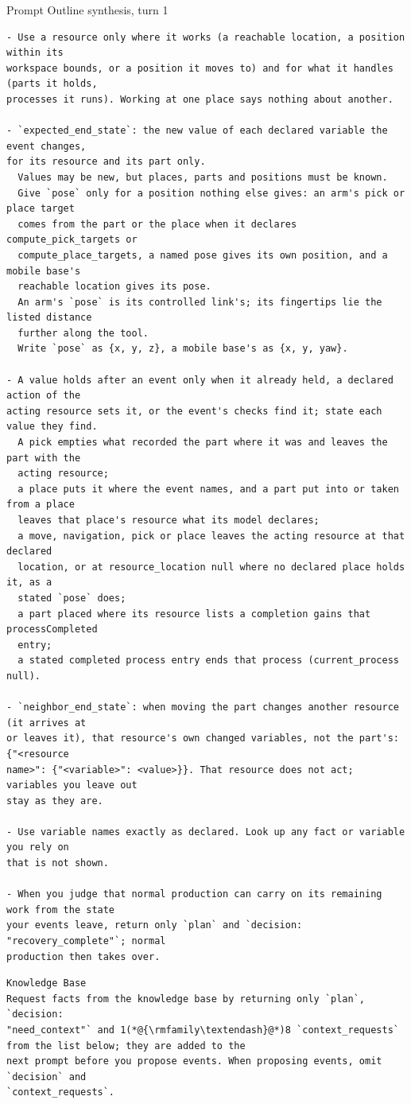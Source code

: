 \documentclass[preprint,12pt,authoryear]{elsarticle}
\begin{document}
\begin{recordbox}[breakable]{Prompt \enspace Outline synthesis, turn 1}
\begin{lstlisting}[style=recorded]
- Use a resource only where it works (a reachable location, a position within its
workspace bounds, or a position it moves to) and for what it handles (parts it holds,
processes it runs). Working at one place says nothing about another.

- `expected_end_state`: the new value of each declared variable the event changes,
for its resource and its part only.
  Values may be new, but places, parts and positions must be known.
  Give `pose` only for a position nothing else gives: an arm's pick or place target
  comes from the part or the place when it declares compute_pick_targets or
  compute_place_targets, a named pose gives its own position, and a mobile base's
  reachable location gives its pose.
  An arm's `pose` is its controlled link's; its fingertips lie the listed distance
  further along the tool.
  Write `pose` as {x, y, z}, a mobile base's as {x, y, yaw}.

- A value holds after an event only when it already held, a declared action of the
acting resource sets it, or the event's checks find it; state each value they find.
  A pick empties what recorded the part where it was and leaves the part with the
  acting resource;
  a place puts it where the event names, and a part put into or taken from a place
  leaves that place's resource what its model declares;
  a move, navigation, pick or place leaves the acting resource at that declared
  location, or at resource_location null where no declared place holds it, as a
  stated `pose` does;
  a part placed where its resource lists a completion gains that processCompleted
  entry;
  a stated completed process entry ends that process (current_process null).

- `neighbor_end_state`: when moving the part changes another resource (it arrives at
or leaves it), that resource's own changed variables, not the part's: {"<resource
name>": {"<variable>": <value>}}. That resource does not act; variables you leave out
stay as they are.

- Use variable names exactly as declared. Look up any fact or variable you rely on
that is not shown.

- When you judge that normal production can carry on its remaining work from the state
your events leave, return only `plan` and `decision: "recovery_complete"`; normal
production then takes over.
\end{lstlisting}
\medskip
\begin{lstlisting}[style=recorded]
Knowledge Base
Request facts from the knowledge base by returning only `plan`, `decision:
"need_context"` and 1(*@{\rmfamily\textendash}@*)8 `context_requests` from the list below; they are added to the
next prompt before you propose events. When proposing events, omit `decision` and
`context_requests`.


\end{lstlisting}
\end{recordbox}
\end{document}

